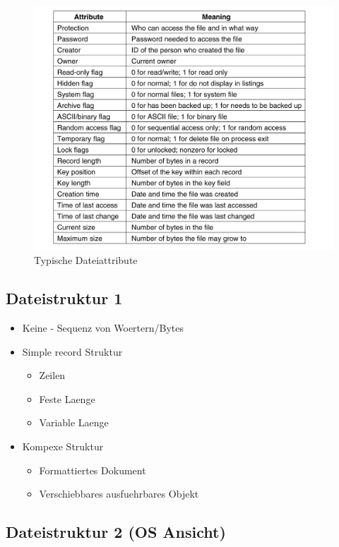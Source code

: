 \documentclass[a4paper]{scrreprt}
\begin{document}
\begin{figure}[ht]
\centering
\includegraphics[scale=0.25]{file_attributes.png}
\caption{Typische Dateiattribute}
\end{figure}

\subsection{Dateistruktur 1}
\begin{itemize}
	\item Keine - Sequenz von Woertern/Bytes
	\item Simple record Struktur
		\begin{itemize}
			\item Zeilen
			\item Feste Laenge
			\item Variable Laenge
		\end{itemize}
	\item Kompexe Struktur
		\begin{itemize}
			\item Formattiertes Dokument
			\item Verschiebbares ausfuehrbares Objekt
		\end{itemize}
\end{itemize}

\subsection{Dateistruktur 2 (OS Ansicht)}
\end{document}
